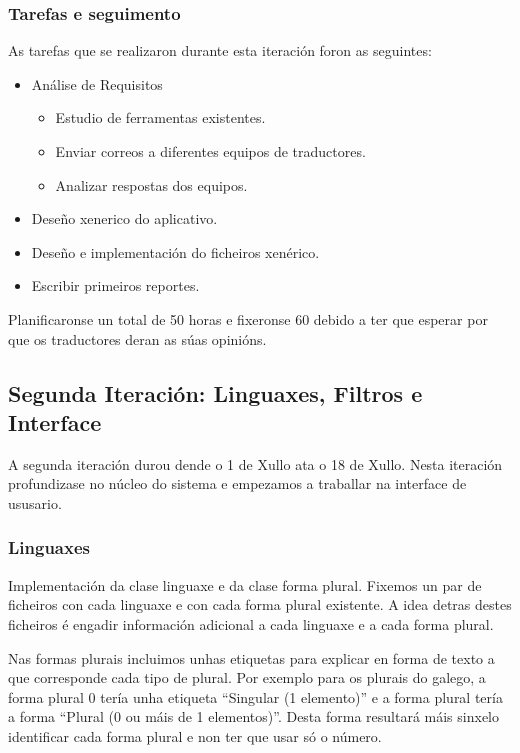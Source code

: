 \subsubsection{Tarefas e seguimento}

As tarefas que se realizaron durante esta iteración foron as seguintes:

\begin{itemize}
  \item Análise de Requisitos
    \begin{itemize}
      \item Estudio de ferramentas existentes.
      \item Enviar correos a diferentes equipos de traductores.
      \item Analizar respostas dos equipos.
    \end{itemize}
  \item Deseño xenerico do aplicativo.
  \item Deseño e implementación do ficheiros xenérico.
  \item Escribir primeiros reportes.
\end{itemize}

Planificaronse un total de 50 horas e fixeronse 60 debido a ter que esperar por que os traductores deran as súas opinións.

\subsection{Segunda Iteración: Linguaxes, Filtros e Interface}

A segunda iteración durou dende o 1 de Xullo ata o 18 de Xullo. Nesta iteración profundizase no núcleo do sistema e empezamos a traballar na interface de ususario.

\subsubsection{Linguaxes}
Implementación da clase linguaxe e da clase forma plural. Fixemos un par de ficheiros con cada linguaxe e con cada forma plural existente. A idea detras destes ficheiros é engadir información adicional a cada linguaxe e a cada forma plural. 

Nas formas plurais incluimos unhas etiquetas para explicar en forma de texto a que corresponde cada tipo de plural. Por exemplo para os plurais do galego, a forma plural 0 tería unha etiqueta ``Singular (1 elemento)'' e a forma plural tería a forma ``Plural (0 ou máis de 1 elementos)''. Desta forma resultará máis sinxelo identificar cada forma plural e non ter que usar só o número.

